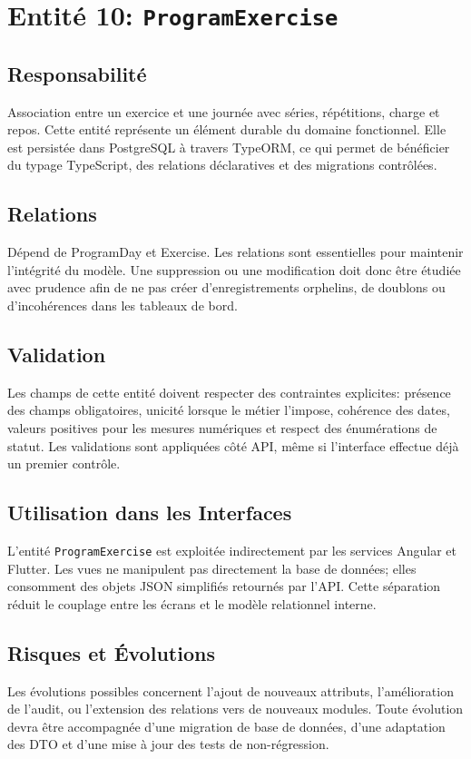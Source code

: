 \section{Entité 10: \texttt{ProgramExercise}}
\subsection{Responsabilité}
Association entre un exercice et une journée avec séries, répétitions, charge et repos. Cette entité représente un élément durable du domaine fonctionnel. Elle est persistée dans PostgreSQL à travers TypeORM, ce qui permet de bénéficier du typage TypeScript, des relations déclaratives et des migrations contrôlées.

\subsection{Relations}
Dépend de ProgramDay et Exercise. Les relations sont essentielles pour maintenir l'intégrité du modèle. Une suppression ou une modification doit donc être étudiée avec prudence afin de ne pas créer d'enregistrements orphelins, de doublons ou d'incohérences dans les tableaux de bord.

\subsection{Validation}
Les champs de cette entité doivent respecter des contraintes explicites: présence des champs obligatoires, unicité lorsque le métier l'impose, cohérence des dates, valeurs positives pour les mesures numériques et respect des énumérations de statut. Les validations sont appliquées côté API, même si l'interface effectue déjà un premier contrôle.

\subsection{Utilisation dans les Interfaces}
L'entité \texttt{ProgramExercise} est exploitée indirectement par les services Angular et Flutter. Les vues ne manipulent pas directement la base de données; elles consomment des objets JSON simplifiés retournés par l'API. Cette séparation réduit le couplage entre les écrans et le modèle relationnel interne.

\subsection{Risques et Évolutions}
Les évolutions possibles concernent l'ajout de nouveaux attributs, l'amélioration de l'audit, ou l'extension des relations vers de nouveaux modules. Toute évolution devra être accompagnée d'une migration de base de données, d'une adaptation des DTO et d'une mise à jour des tests de non-régression.

